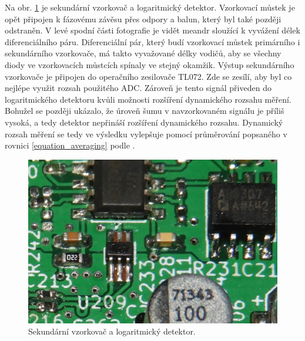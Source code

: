 Na obr. \ref{pcb_log} je sekundární vzorkovač a logaritmický detektor. Vzorkovací můstek je opět připojen k fázovému závěsu přes odpory a balun, který byl také později odstraněn. V levé spodní části fotografie je vidět meandr sloužící k vyvážení délek diferenciálního páru. Diferenciální pár, který budí vzorkovací můstek primárního i sekundárního vzorkovače, má takto vyvažované délky vodičů, aby se všechny diody ve vzorkovacích můstcích spínaly ve stejný okamžik. Výstup sekundárního vzorkovače je připojen do operačního zesilovače TL072. Zde se zesílí, aby byl co nejlépe využit rozsah použitého ADC. Zároveň je tento signál přiveden do logaritmického detektoru kvůli možnosti rozšíření dynamického rozsahu měření. Bohužel se později ukázalo, že úroveň šumu v navzorkovaném signálu je příliš vysoká, a tedy detektor nepřináší rozšíření dynamického rozsahu. Dynamický rozsah měření se tedy ve výsledku vylepšuje pomocí průměrování popsaného v rovnici \ref{equation_averaging} podle \cite{HP54100_article_journal}.
\begin{figure}[htbp]
\includegraphics[width=\textwidth,keepaspectratio]{images/pcb/pcb_log.jpg}\caption{Sekundární vzorkovač a logaritmický detektor.}\label{pcb_log}
\end{figure}

